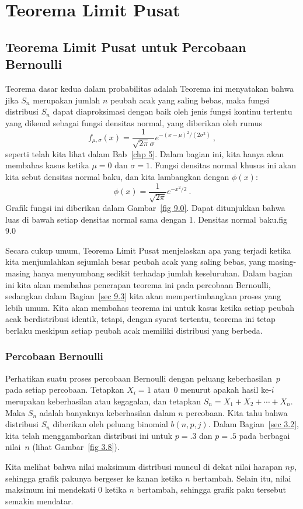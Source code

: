 \chapter {Teorema Limit Pusat}\label{chp 9} 
\section[Percobaan Bernoulli]{Teorema Limit Pusat untuk Percobaan Bernoulli}\label{sec 9.1}
Teorema dasar kedua dalam probabilitas adalah   Teorema ini menyatakan bahwa jika $S_n$ merupakan jumlah $n$
peubah acak yang saling bebas, maka fungsi distribusi $S_n$ dapat
diaproksimasi dengan baik oleh jenis fungsi kontinu tertentu yang dikenal sebagai fungsi densitas
normal, yang diberikan oleh rumus
$$f_{\mu,\sigma}(x) = \frac{1}{\sqrt {2\pi}\sigma}e^{-(x-\mu)^2/(2\sigma^2)}\ ,$$
seperti telah kita lihat dalam Bab~\ref{chp 5}.  Dalam bagian ini, kita hanya akan membahas kasus 
ketika $\mu = 0$ dan $\sigma = 1$.  Fungsi densitas normal khusus ini akan kita sebut densitas normal 
{\emx baku}, dan kita lambangkan dengan $\phi(x)$:
$$\phi(x) = \frac {1}{\sqrt{2\pi}}e^{-x^2/2}\ .$$
Grafik fungsi ini diberikan dalam Gambar~\ref{fig 9.0}.  Dapat ditunjukkan bahwa luas
di bawah setiap densitas normal sama dengan 1.
{Densitas normal baku.}{fig 9.0} 
\par
Secara cukup umum, Teorema Limit Pusat menjelaskan apa yang
terjadi ketika kita menjumlahkan sejumlah besar peubah acak yang saling bebas,
yang masing-masing hanya menyumbang sedikit terhadap jumlah keseluruhan.  Dalam bagian ini kita
akan membahas penerapan teorema ini pada percobaan Bernoulli, sedangkan dalam
Bagian~\ref{sec 9.3} kita akan mempertimbangkan proses yang lebih umum.  Kita akan membahas
teorema ini untuk kasus ketika setiap peubah acak berdistribusi identik,
tetapi, dengan syarat tertentu, teorema ini tetap berlaku meskipun setiap
peubah acak memiliki distribusi yang berbeda.


\subsection*{Percobaan Bernoulli}
Perhatikan suatu proses percobaan Bernoulli dengan peluang keberhasilan~$p$ pada setiap
percobaan.  Tetapkan $X_i = 1$ atau~0 menurut apakah hasil ke-$i$ merupakan keberhasilan atau
kegagalan, dan tetapkan $S_n = X_1 + X_2 +\cdots+ X_n$.  Maka $S_n$ adalah banyaknya
keberhasilan dalam $n$ percobaan.  Kita tahu bahwa distribusi $S_n$ diberikan oleh peluang binomial
$b(n,p,j)$.  Dalam Bagian~\ref{sec 3.2}, kita telah menggambarkan
distribusi ini untuk $p = .3$ dan $p = .5$ pada berbagai nilai~$n$ (lihat Gambar~\ref{fig 3.8}).
\par
Kita melihat bahwa nilai maksimum distribusi muncul di dekat nilai harapan
$np$, sehingga grafik pakunya bergeser ke kanan ketika
$n$ bertambah.  Selain itu, nilai maksimum ini mendekati 0 ketika $n$ bertambah,
sehingga grafik paku tersebut semakin mendatar.

